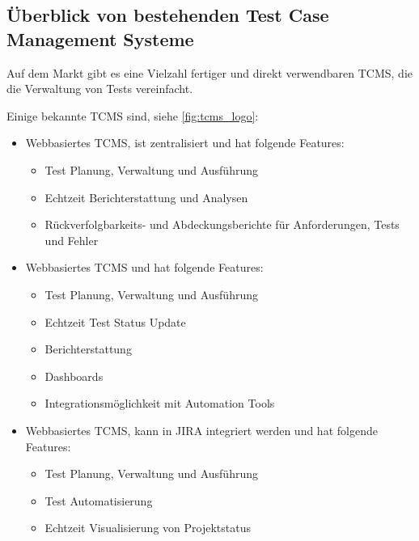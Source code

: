\documentclass[a4paper, fontsize=11pt, parskip=half, twoside]{scrreprt}
\begin{document}
	
	\subsection{Überblick von bestehenden Test Case Management Systeme}
	Auf dem Markt gibt es eine Vielzahl fertiger und direkt verwendbaren \ac{TCMS}, die die Verwaltung von Tests vereinfacht.
	
	Einige bekannte \ac{TCMS} sind, siehe \autoref{fig:tcms_logo}:
	
	\begin{itemize}
		\item \textcite{noauthor_testrail_2023} 
		
		Webbasiertes \ac{TCMS}, ist zentralisiert und hat folgende Features:
		
		\begin{itemize}
			\setlength\itemsep{-0.5em}
			\item Test Planung, Verwaltung und Ausführung 
			\item Echtzeit Berichterstattung und Analysen
			\item Rückverfolgbarkeits- und Abdeckungsberichte für Anforderungen, Tests und Fehler
		\end{itemize}
		
		\item \textcite{noauthor_practitest_nodate} 
		
		Webbasiertes \ac{TCMS} und hat folgende Features:
		
		\begin{itemize}
			\setlength\itemsep{-0.5em}
			\item Test Planung, Verwaltung und Ausführung 
			\item Echtzeit Test Status Update
			\item Berichterstattung
			\item Dashboards
			\item Integrationsmöglichkeit mit Automation Tools
		\end{itemize}
		
		\item \textcite{noauthor_zephyr_nodate} 
		
		Webbasiertes \ac{TCMS}, kann in JIRA integriert werden und hat folgende Features:
		
		\begin{itemize}
			\setlength\itemsep{-0.5em}
			\item Test Planung, Verwaltung und Ausführung 
			\item Test Automatisierung
			\item Echtzeit Visualisierung von Projektstatus
		\end{itemize}
		

\end{itemize}
\end{document}
